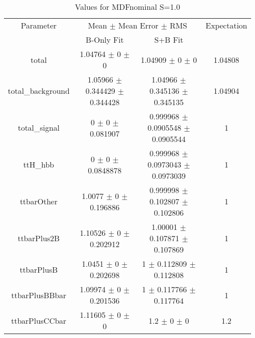 \begin{table}
\centering
\caption{Values for MDFnominal S=1.0}
\begin{tabular}{cccc}
\toprule
Parameter & \multicolumn{2}{c}{Mean $\pm$ Mean Error $\pm$ RMS} & Expectation\\
 & B-Only Fit & S+B Fit & \\
\midrule
total & \num{1.04764} $\pm$ \num{0} $\pm$ \num{0} & \num{1.04909} $\pm$ \num{0} $\pm$ \num{0} & \num{1.04808}\\
total\_background & \num{1.05966} $\pm$ \num{0.344429} $\pm$ \num{0.344428} & \num{1.04966} $\pm$ \num{0.345136} $\pm$ \num{0.345135} & \num{1.04904}\\
total\_signal & \num{0} $\pm$ \num{0} $\pm$ \num{0.081907} & \num{0.999968} $\pm$ \num{0.0905548} $\pm$ \num{0.0905544} & \num{1}\\
ttH\_hbb & \num{0} $\pm$ \num{0} $\pm$ \num{0.0848878} & \num{0.999968} $\pm$ \num{0.0973043} $\pm$ \num{0.0973039} & \num{1}\\
ttbarOther & \num{1.0077} $\pm$ \num{0} $\pm$ \num{0.196886} & \num{0.999998} $\pm$ \num{0.102807} $\pm$ \num{0.102806} & \num{1}\\
ttbarPlus2B & \num{1.10526} $\pm$ \num{0} $\pm$ \num{0.202912} & \num{1.00001} $\pm$ \num{0.107871} $\pm$ \num{0.107869} & \num{1}\\
ttbarPlusB & \num{1.0451} $\pm$ \num{0} $\pm$ \num{0.202698} & \num{1} $\pm$ \num{0.112809} $\pm$ \num{0.112808} & \num{1}\\
ttbarPlusBBbar & \num{1.09974} $\pm$ \num{0} $\pm$ \num{0.201536} & \num{1} $\pm$ \num{0.117766} $\pm$ \num{0.117764} & \num{1}\\
ttbarPlusCCbar & \num{1.11605} $\pm$ \num{0} $\pm$ \num{0} & \num{1.2} $\pm$ \num{0} $\pm$ \num{0} & \num{1.2}\\
\bottomrule
\end{tabular}
\end{table}